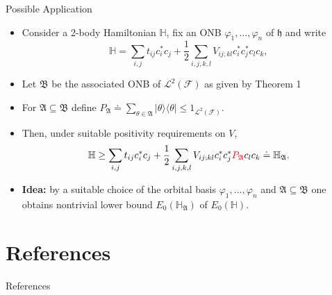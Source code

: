 \documentclass{beamer}
\newcommand{\HS}{{\mathcal{L}^2(\FockSpace)}}
\newcommand{\HilbertSpace}{\ensuremath{\mathfrak{h}}}
\newcommand{\FockSpace}{\mathcal{F}}
\newcommand{\Hamiltonian}{\mathbb{H}}
\begin{document}
\begin{frame}{Possible Application}
    \begin{itemize}
        \item Consider a 2-body Hamiltonian $\Hamiltonian$, fix an ONB
        $\varphi_1,\dots,\varphi_n$ of $\HilbertSpace$ and write
        \begin{equation}
            \Hamiltonian=\sum_{i,j}t_{ij}c_i^*c_j+\frac{1}{2}\sum_{i,j,k,l}V_{ij;kl}c_i^*c_j^*c_lc_k,
        \end{equation}
        \item Let $\mathfrak{B}$ be the associated ONB of $\HS$ as given by Theorem 1
        \item For $\mathfrak{A}\subseteq\mathfrak{B}$ define
        $P_{\mathfrak{A}}\doteq\sum_{\theta\in\mathfrak{A}}\left|\theta\rangle\langle\theta\right|\le
        1_\HS$.
        \item Then, under suitable positivity requirements on $V$,
        \begin{equation}
            \Hamiltonian\ge\sum_{i,j}t_{ij}c_i^*c_j+
            \frac{1}{2}\sum_{i,j,k,l}V_{ij;kl}c_i^*c_j^*\textcolor{red}{P_\mathfrak{A}}c_lc_k
            \doteq\Hamiltonian_\mathfrak{A}.
        \end{equation}
        \item \textbf{Idea:} by a suitable choice
        of the orbital basis $\varphi_1,\ldots,\varphi_n$ and $\mathfrak{A}\subseteq\mathfrak{B}$
        one obtains nontrivial lower bound $E_0(\Hamiltonian_\mathfrak{A})$ of $E_0(\Hamiltonian)$.
    \end{itemize}
\end{frame}

\section*{References}
\begin{frame}[allowframebreaks]{References}
    \nocite{*}
    \printbibliography
\end{frame}
\end{document}

